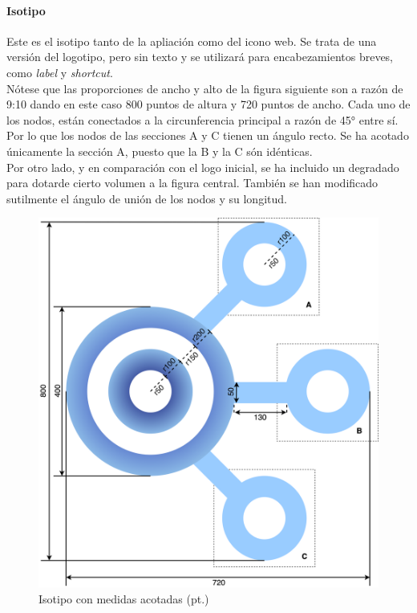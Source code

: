 \documentclass[../ei103948-project-documentation.tex]{subfiles}
\begin{document}
                            \paragraph*{Isotipo}
                            Este es el isotipo tanto de la apliación como del icono web. Se trata de una versión del logotipo, pero sin texto y se utilizará para encabezamientos breves, como \textit{label} y \textit{shortcut}.\\
                    
                            Nótese que las proporciones de ancho y alto de la figura siguiente son a razón de 9:10 dando en este caso 800 puntos de altura y 720 puntos de ancho. Cada uno de los nodos, están conectados a la circunferencia principal a razón de 45° entre sí. Por lo que los nodos de las secciones A y C tienen un ángulo recto. Se ha acotado únicamente la sección A, puesto que la B y la C són idénticas.\\
                    
                            Por otro lado, y en comparación con el logo inicial, se ha incluido un degradado para dotarde cierto volumen a la figura central. También se han modificado sutilmente el ángulo de unión de los nodos y su longitud.
                    
                            \begin{figure}[H]
                                \begin{center}
                                \includegraphics[scale=0.10]{images/LogoIsotipo.png}
                                \end{center}
                                \caption{Isotipo con medidas acotadas (pt.)}
                            \end{figure}
\end{document}
